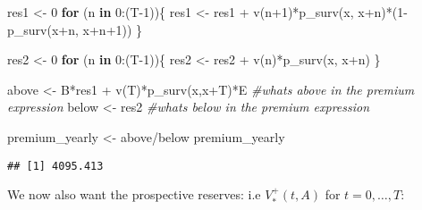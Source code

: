 \documentclass[
]{article}
\newenvironment{Shaded}{\begin{snugshade}}{\end{snugshade}}
\newcommand{\CommentTok}[1]{\textcolor[rgb]{0.56,0.35,0.01}{\textit{#1}}}
\newcommand{\ControlFlowTok}[1]{\textcolor[rgb]{0.13,0.29,0.53}{\textbf{#1}}}
\newcommand{\DecValTok}[1]{\textcolor[rgb]{0.00,0.00,0.81}{#1}}
\newcommand{\FunctionTok}[1]{\textcolor[rgb]{0.00,0.00,0.00}{#1}}
\newcommand{\NormalTok}[1]{#1}
\newcommand{\OtherTok}[1]{\textcolor[rgb]{0.56,0.35,0.01}{#1}}
\newcommand{\SpecialCharTok}[1]{\textcolor[rgb]{0.00,0.00,0.00}{#1}}
\begin{document}
\begin{Shaded}
\begin{Highlighting}[]
\NormalTok{res1 }\OtherTok{\textless{}{-}} \DecValTok{0} 
\ControlFlowTok{for}\NormalTok{ (n }\ControlFlowTok{in} \DecValTok{0}\SpecialCharTok{:}\NormalTok{(T}\DecValTok{{-}1}\NormalTok{))\{}
\NormalTok{  res1 }\OtherTok{\textless{}{-}}\NormalTok{ res1 }\SpecialCharTok{+} \FunctionTok{v}\NormalTok{(n}\SpecialCharTok{+}\DecValTok{1}\NormalTok{)}\SpecialCharTok{*}\FunctionTok{p\_surv}\NormalTok{(x, x}\SpecialCharTok{+}\NormalTok{n)}\SpecialCharTok{*}\NormalTok{(}\DecValTok{1}\SpecialCharTok{{-}}\FunctionTok{p\_surv}\NormalTok{(x}\SpecialCharTok{+}\NormalTok{n, x}\SpecialCharTok{+}\NormalTok{n}\SpecialCharTok{+}\DecValTok{1}\NormalTok{))}
\NormalTok{\}}

\NormalTok{res2 }\OtherTok{\textless{}{-}} \DecValTok{0} 
\ControlFlowTok{for}\NormalTok{ (n }\ControlFlowTok{in} \DecValTok{0}\SpecialCharTok{:}\NormalTok{(T}\DecValTok{{-}1}\NormalTok{))\{}
\NormalTok{  res2 }\OtherTok{\textless{}{-}}\NormalTok{ res2 }\SpecialCharTok{+} \FunctionTok{v}\NormalTok{(n)}\SpecialCharTok{*}\FunctionTok{p\_surv}\NormalTok{(x, x}\SpecialCharTok{+}\NormalTok{n)}
\NormalTok{\}}

\NormalTok{above }\OtherTok{\textless{}{-}}\NormalTok{ B}\SpecialCharTok{*}\NormalTok{res1 }\SpecialCharTok{+} \FunctionTok{v}\NormalTok{(T)}\SpecialCharTok{*}\FunctionTok{p\_surv}\NormalTok{(x,x}\SpecialCharTok{+}\NormalTok{T)}\SpecialCharTok{*}\NormalTok{E }\CommentTok{\#whats above in the premium expression}
\NormalTok{below }\OtherTok{\textless{}{-}}\NormalTok{ res2            }\CommentTok{\#whats below in the premium expression}

\NormalTok{premium\_yearly }\OtherTok{\textless{}{-}}\NormalTok{ above}\SpecialCharTok{/}\NormalTok{below}
\NormalTok{premium\_yearly}
\end{Highlighting}
\end{Shaded}

\begin{verbatim}
## [1] 4095.413
\end{verbatim}

We now also want the prospective reserves: i.e \(V_{*}^{+}(t,A)\) for
\(t = 0, \dots , T\):
\end{document}

